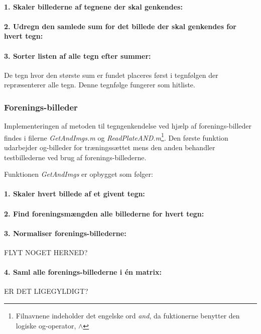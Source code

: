 \paragraph{1. Skaler billederne af tegnene der skal genkendes:}

\paragraph{2. Udregn den samlede sum for det billede der skal genkendes for hvert tegn:}

\paragraph{3. Sorter listen af alle tegn efter summer:} De tegn hvor den største sum er fundet placeres først i tegnfølgen der repræsenterer alle tegn. Denne tegnfølge fungerer som hitliste.

\subsubsection{Forenings-billeder}

Implementeringen af metoden til tegngenkendelse ved hjælp af forenings-billeder findes i filerne \textit{GetAndImgs.m} og \textit{ReadPlateAND.m}\footnote{Filnavnene indeholder det engelske ord \textit{and}, da fuktionerne benytter den logiske og-operator, $\wedge$}. Den første funktion udarbejder og-billeder for træningssættet mens den anden behandler testbillederne ved brug af forenings-billederne.

Funktionen \textit{GetAndImgs} er opbygget som følger:

\paragraph{1. Skaler hvert billede af et givent tegn:}

\paragraph{2. Find foreningsmængden alle billederne for hvert tegn:}

\paragraph{3. Normaliser forenings-billederne:} FLYT NOGET HERNED?

\paragraph{4. Saml alle forenings-billederne i én matrix:} ER DET LIGEGYLDIGT?


